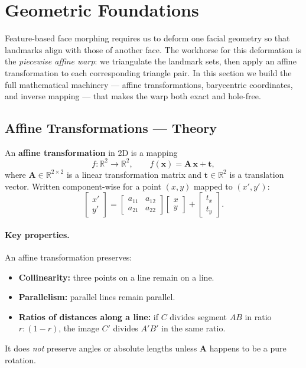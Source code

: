 \section{Geometric Foundations}

Feature-based face morphing requires us to deform one facial geometry so that landmarks align with those of another face.  The workhorse for this deformation is the \emph{piecewise affine warp}: we triangulate the landmark sets, then apply an affine transformation to each corresponding triangle pair.  In this section we build the full mathematical machinery --- affine transformations, barycentric coordinates, and inverse mapping --- that makes the warp both exact and hole-free.

\subsection{Affine Transformations --- Theory}

An \textbf{affine transformation} in 2D is a mapping
\[
    f : \mathbb{R}^2 \to \mathbb{R}^2,
    \qquad f(\mathbf{x}) = \mathbf{A}\,\mathbf{x} + \mathbf{t},
\]
where $\mathbf{A} \in \mathbb{R}^{2 \times 2}$ is a linear transformation matrix and $\mathbf{t} \in \mathbb{R}^2$ is a translation vector.  Written component-wise for a point $(x, y)$ mapped to $(x', y')$:
\[
\begin{bmatrix} x' \\ y' \end{bmatrix}
=
\begin{bmatrix}
    a_{11} & a_{12} \\
    a_{21} & a_{22}
\end{bmatrix}
\begin{bmatrix} x \\ y \end{bmatrix}
+
\begin{bmatrix} t_x \\ t_y \end{bmatrix}.
\]

\paragraph{Key properties.}
An affine transformation preserves:
\begin{itemize}
    \item \textbf{Collinearity:} three points on a line remain on a line.
    \item \textbf{Parallelism:} parallel lines remain parallel.
    \item \textbf{Ratios of distances along a line:} if $C$ divides segment $AB$ in ratio $r\!:\!(1-r)$, the image $C'$ divides $A'B'$ in the same ratio.
\end{itemize}
It does \emph{not} preserve angles or absolute lengths unless $\mathbf{A}$ happens to be a pure rotation.

